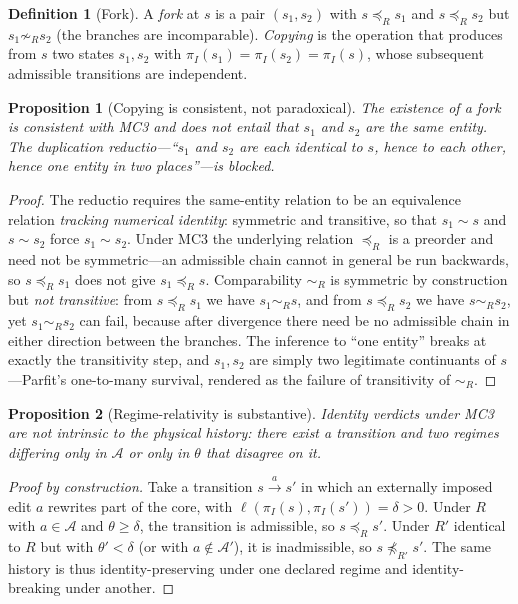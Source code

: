 \documentclass[11pt,a4paper]{article}
\newtheorem{proposition}{Proposition}
\theoremstyle{definition}
\newtheorem{definition}{Definition}
\begin{document}
\begin{definition}[Fork]
A \emph{fork} at $s$ is a pair $(s_1,s_2)$ with $s\preceq_R s_1$ and $s\preceq_R s_2$ but $s_1\not\sim_R s_2$ (the branches are incomparable). \emph{Copying} is the operation that produces from $s$ two states $s_1,s_2$ with $\pi_I(s_1)=\pi_I(s_2)=\pi_I(s)$, whose subsequent admissible transitions are independent.
\end{definition}

\begin{proposition}[Copying is consistent, not paradoxical]\label{prop:fork}
The existence of a fork is consistent with MC3 and does not entail that $s_1$ and $s_2$ are the same entity. The duplication \emph{reductio}---``$s_1$ and $s_2$ are each identical to $s$, hence to each other, hence one entity in two places''---is blocked.
\end{proposition}
\begin{proof}
The reductio requires the same-entity relation to be an equivalence relation \emph{tracking numerical identity}: symmetric and transitive, so that $s_1\sim s$ and $s\sim s_2$ force $s_1\sim s_2$. Under MC3 the underlying relation $\preceq_R$ is a preorder and need not be symmetric---an admissible chain cannot in general be run backwards, so $s\preceq_R s_1$ does not give $s_1\preceq_R s$. Comparability $\sim_R$ is symmetric by construction but \emph{not transitive}: from $s\preceq_R s_1$ we have $s_1\sim_R s$, and from $s\preceq_R s_2$ we have $s\sim_R s_2$, yet $s_1\sim_R s_2$ can fail, because after divergence there need be no admissible chain in either direction between the branches. The inference to ``one entity'' breaks at exactly the transitivity step, and $s_1,s_2$ are simply two legitimate continuants of $s$---Parfit's one-to-many survival, rendered as the failure of transitivity of $\sim_R$.
\end{proof}

\begin{proposition}[Regime-relativity is substantive]\label{prop:relativity}
Identity verdicts under MC3 are not intrinsic to the physical history: there exist a transition and two regimes differing only in $\mathcal{A}$ or only in $\theta$ that disagree on it.
\end{proposition}
\begin{proof}[Proof by construction]
Take a transition $s\xrightarrow{a}s'$ in which an externally imposed edit $a$ rewrites part of the core, with $\ell(\pi_I(s),\pi_I(s'))=\delta>0$. Under $R$ with $a\in\mathcal{A}$ and $\theta\ge\delta$, the transition is admissible, so $s\preceq_R s'$. Under $R'$ identical to $R$ but with $\theta'<\delta$ (or with $a\notin\mathcal{A}'$), it is inadmissible, so $s\not\preceq_{R'}s'$. The same history is thus identity-preserving under one declared regime and identity-breaking under another.
\end{proof}
\end{document}
